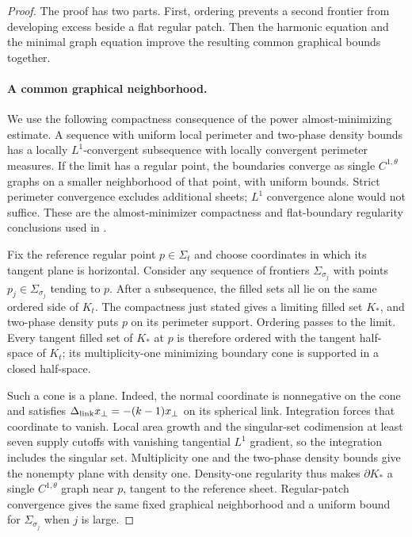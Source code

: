\begin{proof}
The proof has two parts. First, ordering prevents a second frontier
from developing excess beside a flat regular patch. Then the harmonic
equation and the minimal graph equation improve the resulting common
graphical bounds together.

\paragraph{A common graphical neighborhood.}
We use the following compactness consequence of the power
almost-minimizing estimate. A sequence with uniform local perimeter
and two-phase density bounds has a locally $L^1$-convergent
subsequence with locally convergent perimeter measures. If the limit
has a regular point, the boundaries converge as single
$C^{1,\theta}$ graphs on a smaller neighborhood of that point,
with uniform bounds. Strict perimeter convergence excludes additional
sheets; $L^1$ convergence alone would not suffice. These are the
almost-minimizer compactness and flat-boundary regularity conclusions
used in \cite[Theorem~2.27]{BiZhu2026v2}.

Fix the reference regular point $p\in\Sigma_t$ and choose coordinates
in which its tangent plane is horizontal. Consider any sequence of
frontiers $\Sigma_{\sigma_j}$ with points
$p_j\in\Sigma_{\sigma_j}$ tending to $p$. After a
subsequence, the filled sets all lie on the same ordered side of
$K_t$. The compactness just stated gives a limiting filled set $K_*$,
and two-phase density puts $p$ on its perimeter support. Ordering
passes to the limit. Every tangent filled set of $K_*$ at $p$ is
therefore ordered with the tangent half-space of $K_t$; its
multiplicity-one minimizing boundary cone is supported in a closed
half-space.

Such a cone is a plane. Indeed, the normal coordinate is nonnegative
on the cone and satisfies
$\Delta_{\rm link}x_\perp=-(k-1)x_\perp$ on its spherical link.
Integration forces that coordinate to vanish. Local area growth and
the singular-set codimension at least seven supply cutoffs with
vanishing tangential $L^1$ gradient, so the integration includes the
singular set. Multiplicity one and the two-phase density bounds give
the nonempty plane with density one. Density-one regularity thus
makes $\partial K_*$ a single $C^{1,\theta}$ graph near $p$, tangent
to the reference sheet. Regular-patch convergence gives the same
fixed graphical neighborhood and a uniform bound for
$\Sigma_{\sigma_j}$ when $j$ is large.


\end{proof}
